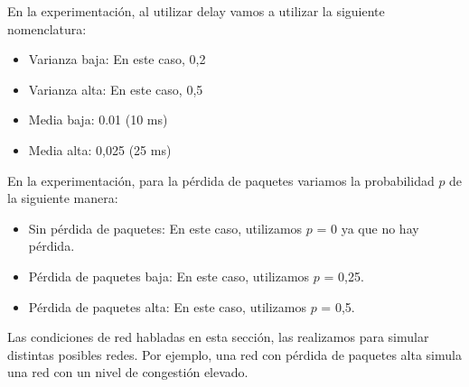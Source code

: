 
En la experimentación, al utilizar delay vamos a utilizar la siguiente nomenclatura:
\begin{itemize}
 \item Varianza baja: En este caso, 0,2
 \item Varianza alta: En este caso, 0,5
 \item Media baja: 0.01 (10 ms)
 \item Media alta: 0,025 (25 ms)
\end{itemize}
 
En la experimentación, para la pérdida de paquetes variamos la probabilidad $p$ de la siguiente manera:
\begin{itemize}
 \item Sin pérdida de paquetes: En este caso, utilizamos $p$ = 0 ya que no hay pérdida. 
 \item Pérdida de paquetes baja: En este caso, utilizamos $p$ = 0,25.
 \item Pérdida de paquetes alta: En este caso, utilizamos $p$ = 0,5.
\end{itemize}

Las condiciones de red habladas en esta sección, las realizamos para simular distintas posibles redes. Por ejemplo, una red con pérdida de paquetes alta simula una red con un nivel de congestión elevado.